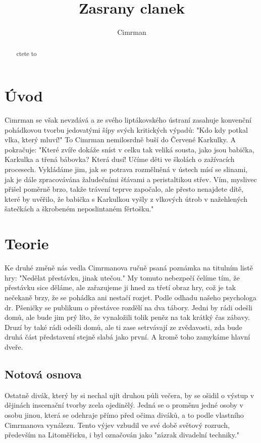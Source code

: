 \documentclass[11pt, a4paper]{article}
\title{Zasrany clanek}
\author{Cimrman}
\begin{document}
\maketitle
\begin{abstract}
	ctete to
\end{abstract}

\section{Úvod}
Cimrman se však nevzdává a ze svého liptákovského ústraní zasahuje konvenční pohádkovou tvorbu jedovatými šípy svých kritických výpadů: "Kdo kdy potkal vlka, který mluví!" To Cimrman nemilosrdně buší do Červené Karkulky. A pokračuje: "Které zvíře dokáže sníst v celku tak veliká sousta, jako jsou babička, Karkulka a třená bábovka? Která dusí! Učíme děti ve školách o zažívacích procesech. Vykládáme jim, jak se potrava rozmělněná v ústech mísí se slinami, jak je dále zpracovávána žaludečními šťávami a peristaltikou střev. Vím, myslivec přišel poměrně brzo, takže trávení teprve započalo, ale přesto nenajdete dítě, které by uvěřilo, že babička s Karkulkou vyšly z vlkových útrob v nažehlených šatečkách a škrobeném neposlintaném fěrtošku."
\section{Teorie}
Ke druhé změně nás vedla Cimrmanova ručně psaná poznámka na titulním listě hry: "Nedělat přestávku, jinak utečou." My tomuto nebezpečí čelíme tím, že přestávku sice děláme, ale zařazujeme ji hned za třetí obraz hry, což je tak nečekaně brzy, že se pohádka ani nestačí rozjet. Podle odhadu našeho psychologa dr. Pšeničky se publikum o přestávce rozdělí na dva tábory. Jedni by rádi odešli domů, ale bude jim prý líto, že vynaložili tolik peněz na tak krátký čas zábavy. Druzí by také rádi odešli domů, ale ti zase setrvávají ze zvědavosti, zda bude druhá část představení stejně slabá jako první. A kromě toho zamykáme hlavní dveře.


\subsection{Notová osnova}
Ostatně divák, který by si nechal ujít druhou půli večera, by se ošidil o výstup v dějinách inscenační tvorby zcela ojedinělý. Jedná se o proměnu jedné osoby v osobu jinou, která se odehraje přímo před očima diváků, a to podle vlastního Cimrmanova vynálezu. Tento výjev vzbudil ve své době světový rozruch, především na Litoměřicku, i byl označován jako "zázrak divadelní techniky."
\end{document}
